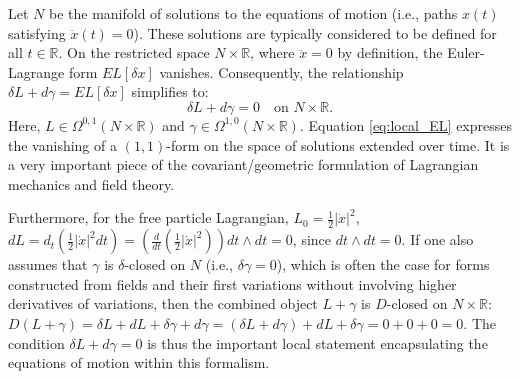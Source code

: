 Let $N$ be the manifold of solutions to the equations of motion (i.e., paths $x(t)$ satisfying $\ddot{x}(t)=0$). These solutions are typically considered to be defined for all $t \in \mathbb{R}$. On the restricted space $N \times \mathbb{R}$, where $\ddot{x}=0$ by definition, the Euler-Lagrange form $EL[\delta x]$ vanishes. Consequently, the relationship $\delta L + d\gamma = EL[\delta x]$ simplifies to:
\begin{equation}
\label{eq:local_EL}
\delta L + d\gamma = 0 \quad \text{on } N \times \mathbb{R}.
\end{equation}
Here, $L \in \Omega^{0,1}(N \times \mathbb{R})$ and $\gamma \in \Omega^{1,0}(N \times \mathbb{R})$. Equation \eqref{eq:local_EL} expresses the vanishing of a $(1,1)$-form on the space of solutions extended over time. It is a very important piece of the covariant/geometric formulation of Lagrangian mechanics and field theory.

Furthermore, for the free particle Lagrangian, $L_0 = \frac{1}{2}|\dot{x}|^2$, $dL = d_t (\frac{1}{2}|\dot{x}|^2 dt) = \left( \frac{d}{dt}(\frac{1}{2}|\dot{x}|^2) \right) dt \wedge dt = 0$, since $dt \wedge dt = 0$. If one also assumes that $\gamma$ is $\delta$-closed on $N$ (i.e., $\delta\gamma = 0$), which is often the case for forms constructed from fields and their first variations without involving higher derivatives of variations, then the combined object $L+\gamma$ is $D$-closed on $N \times \mathbb{R}$:
$D(L+\gamma) = \delta L + dL + \delta\gamma + d\gamma = (\delta L + d\gamma) + dL + \delta\gamma = 0 + 0 + 0 = 0.$
The condition $\delta L + d\gamma = 0$ is thus the important local statement encapsulating the equations of motion within this formalism.

